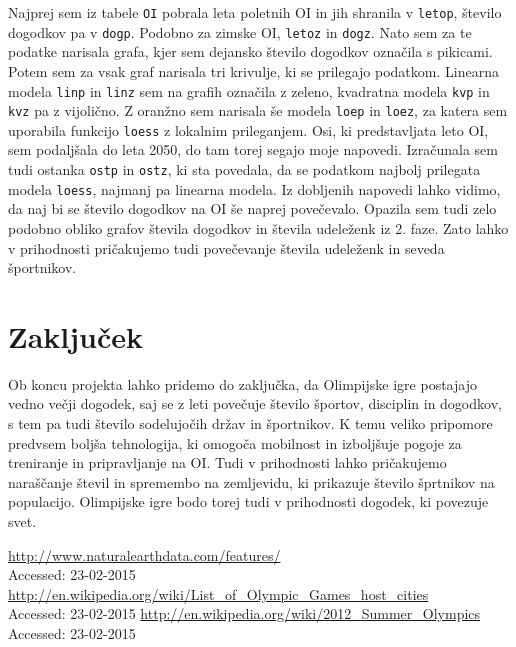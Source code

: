 \documentclass[11pt,a4paper]{article}
\begin{document}
\begin{enumerate}
{Najprej sem iz tabele \verb|OI| pobrala leta poletnih OI in jih shranila v \verb|letop|, število dogodkov pa v \verb|dogp|. Podobno za zimske OI, \verb|letoz| in \verb|dogz|. Nato sem za te podatke narisala grafa, kjer sem dejansko število dogodkov označila s pikicami. Potem sem za vsak graf narisala tri krivulje, ki se prilegajo podatkom. Linearna modela \verb|linp| in \verb|linz| sem na grafih označila z zeleno, kvadratna modela \verb|kvp| in \verb|kvz| pa z vijolično. Z oranžno sem narisala še modela \verb|loep| in \verb|loez|, za katera sem uporabila funkcijo \verb|loess| z lokalnim prileganjem. Osi, ki predstavljata leto OI, sem podaljšala do leta 2050, do tam torej segajo moje napovedi. Izračunala sem tudi ostanka \verb|ostp| in \verb|ostz|, ki sta povedala, da se podatkom najbolj prilegata modela \verb|loess|, najmanj pa linearna modela.
\newline
Iz dobljenih napovedi lahko vidimo, da naj bi se število dogodkov na OI še naprej povečevalo. Opazila sem tudi zelo podobno obliko grafov števila dogodkov in števila udeleženk iz 2. faze. Zato  lahko v prihodnosti pričakujemo tudi povečevanje števila udeleženk in seveda športnikov.
}

\end{enumerate}

\section{Zaključek}
Ob koncu projekta lahko pridemo do zaključka, da Olimpijske igre postajajo vedno večji dogodek, saj se z leti povečuje število športov, disciplin in dogodkov, s tem pa tudi število sodelujočih držav in športnikov. K temu veliko pripomore predvsem boljša tehnologija, ki omogoča mobilnost in izboljšuje pogoje za treniranje in pripravljanje na OI. Tudi v prihodnosti lahko pričakujemo naraščanje števil in spremembo na zemljevidu, ki prikazuje število šprtnikov na populacijo. Olimpijske igre bodo torej tudi v prihodnosti dogodek, ki povezuje svet.

\newpage
\begin{thebibliography}{9}
  \url{http://www.naturalearthdata.com/features/}\\
  {Accessed: 23-02-2015}
  \url{http://en.wikipedia.org/wiki/List_of_Olympic_Games_host_cities}\\
  {Accessed: 23-02-2015}
  \url{http://en.wikipedia.org/wiki/2012_Summer_Olympics}\\
  {Accessed: 23-02-2015}

\end{thebibliography}
\end{document}
